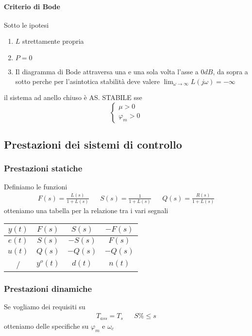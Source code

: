 \documentclass{article}
\begin{document}
	\paragraph{Criterio di Bode}
	Sotto le ipotesi
	\begin{enumerate}
		\item $L$ strettamente propria
		\item $P=0$
		\item Il diagramma di Bode attraversa una e una sola volta l'asse a $0dB$, da sopra a sotto perche per l'asintotica stabilità deve valere  $\lim_{\omega\to\infty} L(j\omega) = -\infty$
	\end{enumerate}
	il sistema ad anello chiuso è AS. STABILE sse
	\begin{equation}
		\begin{cases}
			\mu > 0\\
			\varphi_m > 0
		\end{cases}
	\end{equation}
	
	\newpage
	\subsection{Prestazioni dei sistemi di controllo}
	\subsubsection{Prestazioni statiche}
	Definiamo le funzioni
	\begin{align*}
		F(s) = \frac{L(s)}{1+L(s)} && S(s) = \frac{1}{1+L(s)} && Q(s) = \frac{R(s)}{1+L(s)}
	\end{align*}
	otteniamo una tabella per la relazione tra i vari segnali
	\begin{center}
		\begin{tabular}{c | c | c | c}
			\hline
			$y(t)$ & $F(s)$ & $S(s)$ & $-F(s)$ \\ \hline
			$e(t)$ & $S(s)$ & $-S(s)$ & $F(s)$ \\ \hline
			$u(t)$ & $Q(s)$ & $-Q(s)$ & $-Q(s)$ \\ \hline
			/	   & $y^o(t)$ & $d(t)$ & $n(t)$ \\ \hline
		\end{tabular}
	\end{center}
	\subsubsection{Prestazioni dinamiche}
	Se vogliamo dei requisiti su
	\begin{align*}
		T_{ass} = T_s && S\% \leq  s
	\end{align*}
	otteniamo delle specifiche su $\varphi_m$ e $\omega_c$
\end{document}
